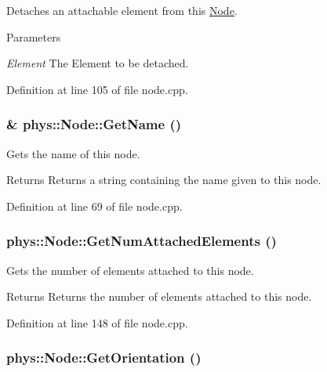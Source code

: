 Detaches an attachable element from this \hyperlink{classphys_1_1Node}{Node}. 


\begin{DoxyParams}{Parameters}
\item[{\em Element}]The Element to be detached. \end{DoxyParams}


Definition at line 105 of file node.cpp.

\hypertarget{classphys_1_1Node_a2db8f0717abc20a43b7154bdc99ecf0e}{
\subsubsection[{GetName}]{ \& phys::Node::GetName ()}}
\label{d0/ddc/classphys_1_1Node_a2db8f0717abc20a43b7154bdc99ecf0e}


Gets the name of this node. 

\begin{DoxyReturn}{Returns}
Returns a string containing the name given to this node. 
\end{DoxyReturn}


Definition at line 69 of file node.cpp.

\hypertarget{classphys_1_1Node_ae4ee282575f7b1e6bb9dfcda15fcfd47}{
\subsubsection[{GetNumAttachedElements}]{ phys::Node::GetNumAttachedElements ()}}
\label{d0/ddc/classphys_1_1Node_ae4ee282575f7b1e6bb9dfcda15fcfd47}


Gets the number of elements attached to this node. 

\begin{DoxyReturn}{Returns}
Returns the number of elements attached to this node. 
\end{DoxyReturn}


Definition at line 148 of file node.cpp.

\hypertarget{classphys_1_1Node_af9bda096f298c0ae692d52dd3b7c3733}{
\subsubsection[{GetOrientation}]{ phys::Node::GetOrientation ()}}
\label{d0/ddc/classphys_1_1Node_af9bda096f298c0ae692d52dd3b7c3733}


